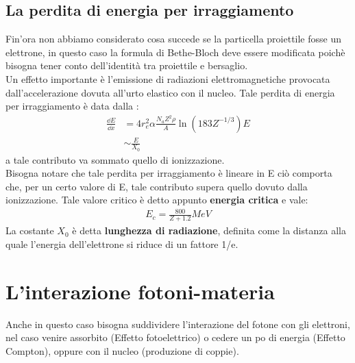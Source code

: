 \subsection{La perdita di energia per irraggiamento}
Fin'ora non abbiamo considerato cosa succede se la particella proiettile fosse un elettrone, 
in questo caso la formula di Bethe-Bloch deve essere modificata poichè bisogna tener conto 
dell'identità tra proiettile e bersaglio.\\
Un effetto importante è l'emissione di radiazioni elettromagnetiche provocata dall'accelerazione
dovuta all'urto elastico con il nucleo.
Tale perdita di energia per irraggiamento è data dalla :
\begin{align*}
        \frac{\dd{E}}{\dd{x}} &= 4r_{e}^2\alpha\frac{N_{a}Z^2\rho}{A}\ln{(183Z^{-1/3})}E \\[1em]
                              &\sim \frac{E}{X_{0}}
\end{align*}
a tale contributo va sommato quello di ionizzazione.\\
Bisogna notare che tale perdita per irraggiamento è lineare in E ciò comporta che, per un 
certo valore di E, tale contributo supera quello dovuto dalla ionizzazione.
Tale valore critico è detto appunto \textbf{energia critica} e vale:
\begin{align*}
    E_{c} = \frac{800}{Z+1.2}MeV
\end{align*}
La costante $X_{0}$ è detta \textbf{lunghezza di radiazione}, definita come la distanza alla
quale l'energia dell'elettrone si riduce di un fattore 1/e.
\section{L'interazione fotoni-materia}
Anche in questo caso bisogna suddividere l'interazione del fotone con gli elettroni, nel caso
venire assorbito (Effetto fotoelettrico) o cedere un po di energia (Effetto Compton), oppure
con il nucleo (produzione di coppie).
